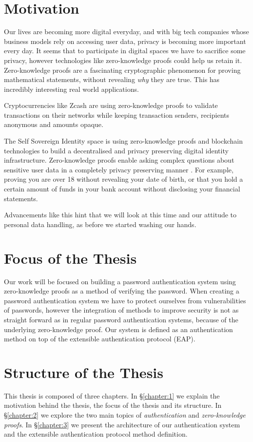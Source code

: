 \section{Motivation}
Our lives are becoming more digital everyday, and with big tech companies whose business models rely on accessing user data, privacy is becoming more important every day.
It seems that to participate in digital spaces we have to sacrifice some privacy, however technologies like zero-knowledge proofs could help us retain it.
Zero-knowledge proofs are a fascinating cryptographic phenomenon for proving mathematical statements, without revealing \textit{why} they are true. 
This has incredibly interesting real world applications.

Cryptocurrencies like Zcash \cite{hopwood2016zcash} are using zero-knowledge proofs to validate transactions on their networks while keeping transaction senders, recipients anonymous and amounts opaque.

The Self Sovereign Identity space is using zero-knowledge proofs and blockchain technologies to build a decentralised and privacy preserving digital identity infrastructure.
Zero-knowledge proofs enable asking complex questions about sensitive user data in a completely privacy preserving manner \cite{10.1007/978-3-540-89255-7_15}.
For example, proving you are over 18 without revealing your date of birth, or that you hold a certain amount of funds in your bank account without disclosing your financial statements.

Advancements like this hint that we will look at this time and our attitude to personal data handling, as before we started washing our hands.
\bigskip

\section{Focus of the Thesis}
Our work will be focused on building a password authentication system using zero-knowledge proofs as a method of verifying the password.
When creating a password authentication system we have to protect ourselves from vulnerabilities of passwords, however the integration of methods to improve security is not as straight forward as in regular password authentication systems, because of the underlying zero-knowledge proof.
Our system is defined as an authentication method on top of the extensible authentication protocol (EAP).

\section{Structure of the Thesis}
This thesis is composed of three chapters.
In \S\ref{chapter:1} we explain the motivation behind the thesis, the focus of the thesis and its structure.
In \S\ref{chapter:2} we explore the two main topics of \textit{authentication} and \textit{zero-knowledge proofs}.
In \S\ref{chapter:3} we present the architecture of our authentication system and the extensible authentication protocol method definition.

